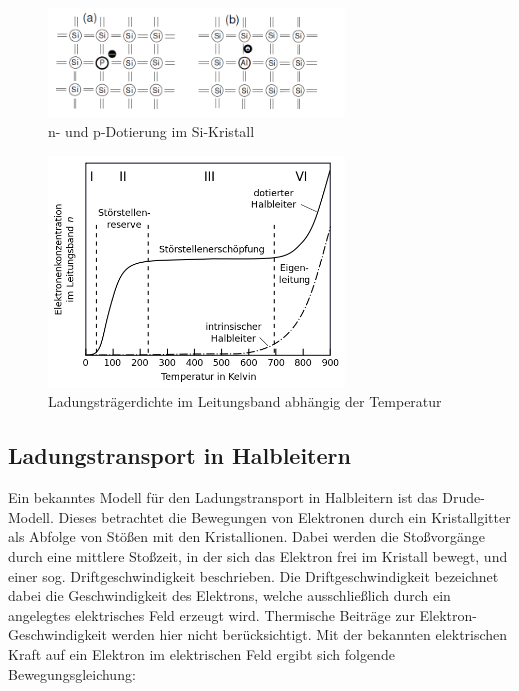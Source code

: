 \begin{figure}[htbp]  
     \includegraphics[width=0.7\textwidth]{Dotierung.png}
  \caption{n- und p-Dotierung im Si-Kristall \cite{Hofmann}}
  \label{Dotierung}
\end{figure}

\begin{figure}[htbp]  
     \includegraphics[width=0.7\textwidth]{Leitung.png}
  \caption{Ladungsträgerdichte im Leitungsband abhängig der Temperatur \cite{Leitung}}
\label{Leitung}
\end{figure}

\subsection{Ladungstransport in Halbleitern}

Ein bekanntes Modell für den Ladungstransport in Halbleitern ist das Drude-Modell. Dieses betrachtet die Bewegungen von Elektronen durch ein Kristallgitter als Abfolge von Stößen mit den Kristallionen. Dabei werden die Stoßvorgänge durch eine mittlere Stoßzeit, in der sich das Elektron frei im Kristall bewegt, und einer sog. Driftgeschwindigkeit beschrieben. Die Driftgeschwindigkeit bezeichnet dabei die Geschwindigkeit des Elektrons, welche ausschließlich durch ein angelegtes elektrisches Feld erzeugt wird. Thermische Beiträge zur Elektron-Geschwindigkeit werden hier nicht berücksichtigt. Mit der bekannten elektrischen Kraft auf ein Elektron im elektrischen Feld ergibt sich folgende 
Bewegungsgleichung:

